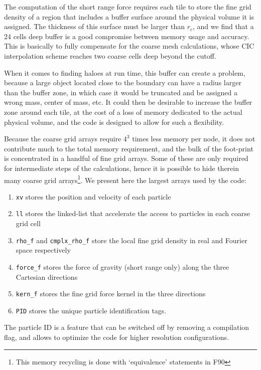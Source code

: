 The computation of the short range force requires each tile to store the fine grid density of a region that includes a buffer surface around the physical volume it is assigned. The thickness of this surface must be larger than $r_{c}$, and we find that a 24 cells deep buffer
is a good compromise between memory usage and accuracy.
This is basically to fully compensate for the coarse mesh calculations, whose CIC interpolation scheme 
reaches two coarse cells deep beyond the cutoff.   

When it comes to finding haloes at run time, this buffer can create a problem, because a large object located close to the boundary can have a radius larger than the buffer zone, in which case it would be truncated and be assigned a wrong mass, center of mass, etc. 
It could then be desirable to increase the buffer zone around each tile, at the cost of a loss of memory dedicated to the actual physical volume, and the code is designed to allow for such a flexibility.



Because the coarse grid arrays require $4^3$ times less memory per node, 
it does not contribute much to the total memory requirement, and the bulk of the foot-print is 
concentrated in a handful of fine grid arrays.
Some of these are only required for intermediate steps of the calculations, 
hence it is possible to hide therein many coarse grid arrays\footnote{ This memory recycling is done with `equivalence' statements in {\small F90}}.   
We present here the largest arrays used by the code:
\begin{enumerate}
\item{{\tt xv} stores the position and velocity of each particle} 
\item{{\tt ll} stores the linked-list that accelerate the access to particles in each coarse grid cell}
\item{{\tt rho\_f} and {\tt cmplx\_rho\_f} store 
the local fine grid density  in real and Fourier space respectively}
\item{{\tt force\_f} stores the force of gravity (short range only) along the three Cartesian directions}
\item{{\tt kern\_f} stores the fine grid force kernel in the three directions}
\item{{\tt PID} stores the unique particle identification tags.}
\end{enumerate}
The particle ID is a feature that can be switched off by removing a compilation flag, 
and allows to optimize the code for higher resolution configurations.

